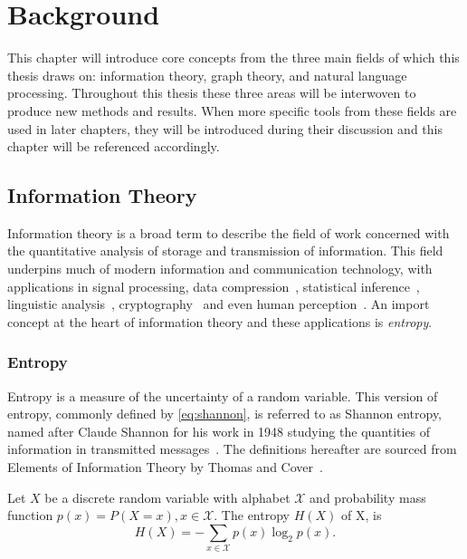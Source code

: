 \chapter{Background}\label{ch:background}

This chapter will introduce core concepts from the three main fields of which this thesis draws on: information theory, graph theory, and natural language processing. Throughout this thesis these three areas will be interwoven to produce new methods and results. When more specific tools from these fields are used in later chapters, they will be introduced during their discussion and this chapter will be referenced accordingly.

\section{Information Theory}
Information theory is a broad term to describe the field of work concerned with the quantitative analysis of storage and transmission of information. This field underpins much of modern information and communication technology, with applications in signal processing, data compression~\cite{schurmann1996entropy, bell1989modeling}, statistical inference~\cite{burnham_model_2002}, linguistic analysis~\cite{collobert2011natural,greenberg1963universals}, cryptography~\cite{menezes2018handbook} and even human perception~\cite{delgado-bonal_human_2016}. An import concept at the heart of information theory and these applications is \emph{entropy}.


\subsection{Entropy}
Entropy is a measure of the uncertainty of a random variable. This version of entropy, commonly defined by \autoref{eq:shannon}, is referred to as Shannon entropy, named after Claude Shannon for his work in 1948 studying the quantities of information in transmitted messages~\cite{shannon_mathematical_1948}. The definitions hereafter are sourced from Elements of Information Theory by Thomas and Cover~\cite{cover_elements_2012}.

\begin{definition}
	Let $X$ be a discrete random variable with alphabet $\mathcal{X}$ and probability mass function $p(x) = P(X = x), x \in \mathcal{X}$.
	The entropy $H(X)$ of X, is 
	\begin{equation}\label{eq:shannon}
	H(X)=-\sum_{x \in \mathcal{X}} p(x) \log_2 p(x).
	\end{equation}
\end{definition} 


